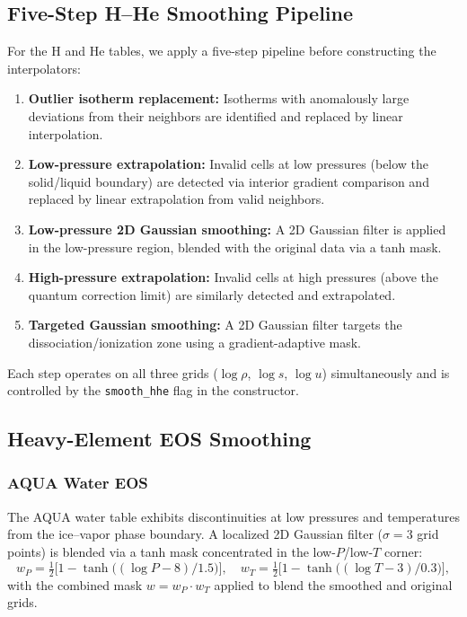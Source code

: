 \documentclass[twocolumn]{aastex701}
\begin{document}
\subsection{Five-Step H--He Smoothing Pipeline}

For the H and He tables, we apply a five-step pipeline before constructing the interpolators:
\begin{enumerate}
    \item \textbf{Outlier isotherm replacement:} Isotherms with anomalously large deviations from their neighbors are identified and replaced by linear interpolation.
    \item \textbf{Low-pressure extrapolation:} Invalid cells at low pressures (below the solid/liquid boundary) are detected via interior gradient comparison and replaced by linear extrapolation from valid neighbors.
    \item \textbf{Low-pressure 2D Gaussian smoothing:} A 2D Gaussian filter is applied in the low-pressure region, blended with the original data via a tanh mask.
    \item \textbf{High-pressure extrapolation:} Invalid cells at high pressures (above the quantum correction limit) are similarly detected and extrapolated.
    \item \textbf{Targeted Gaussian smoothing:} A 2D Gaussian filter targets the dissociation/ionization zone using a gradient-adaptive mask.
\end{enumerate}
Each step operates on all three grids ($\log\rho$, $\log s$, $\log u$) simultaneously and is controlled by the \texttt{smooth\_hhe} flag in the constructor.

\subsection{Heavy-Element EOS Smoothing}

\subsubsection{AQUA Water EOS}
The AQUA water table exhibits discontinuities at low pressures and temperatures from the ice--vapor phase boundary.
A localized 2D Gaussian filter ($\sigma = 3$ grid points) is blended via a tanh mask concentrated in the low-$P$/low-$T$ corner:
\begin{equation}
    w_P = \tfrac{1}{2}\bigl[1 - \tanh\bigl((\log P - 8)/1.5\bigr)\bigr], \quad
    w_T = \tfrac{1}{2}\bigl[1 - \tanh\bigl((\log T - 3)/0.3\bigr)\bigr],
\end{equation}
with the combined mask $w = w_P \cdot w_T$ applied to blend the smoothed and original grids.
\end{document}
